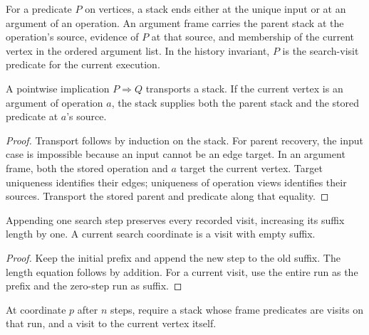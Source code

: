 \begin{definition}
For a predicate $P$ on vertices, a stack ends either at the unique input or at
an argument of an operation. An argument frame carries the parent stack at
the operation's source, evidence of $P$ at that source, and membership of the
current vertex in the ordered argument list. In the history invariant, $P$
is the search-visit predicate for the current execution.
\end{definition}
\begin{lemma}
A pointwise implication $P\Rightarrow Q$ transports a stack. If the current
vertex is an argument of operation $a$, the stack supplies both the parent
stack and the stored predicate at $a$'s source.
\end{lemma}
\begin{proof}
Transport follows by induction on the stack. For parent recovery, the input
case is impossible because an input cannot be an edge target. In an argument
frame, both the stored operation and $a$ target the current vertex. Target
uniqueness identifies their edges; uniqueness of operation views identifies
their sources. Transport the stored parent and predicate along that equality.
\end{proof}


\begin{lemma}
Appending one search step preserves every recorded visit, increasing its suffix
length by one. A current search coordinate is a visit with empty suffix.
\end{lemma}
\begin{proof}
Keep the initial prefix and append the new step to the old suffix. The length
equation follows by addition. For a current visit, use the entire run as the
prefix and the zero-step run as suffix.
\end{proof}
\begin{definition}
At coordinate $p$ after $n$ steps, require a stack whose frame predicates are
visits on that run, and a visit to the current vertex itself.
\end{definition}


